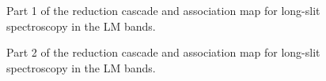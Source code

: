 
\begin{landscape}
\begin{figure}[ht]
  \centering
  \resizebox{\linewidth}{!}{}
  \caption[Reduction cascade and association map for LM long-slit
  spectroscopy]{Part 1 of the reduction cascade and association map for long-slit
    spectroscopy in the LM bands.}
  \label{Fig:LMLssAssomap1}
\end{figure}
\end{landscape}

\begin{landscape}
\begin{figure}[ht]
  \centering
  \resizebox{\linewidth}{!}{}
  \caption[Reduction cascade and association map for LM long-slit
  spectroscopy]{Part 2 of the reduction cascade and association map for long-slit
    spectroscopy in the LM bands.}
  \label{Fig:LMLssAssomap2}
\end{figure}
\end{landscape}




